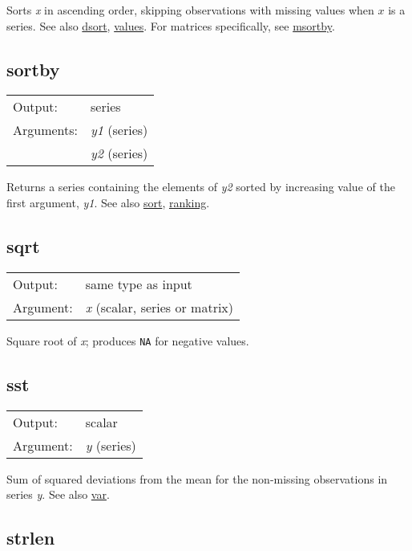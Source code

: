 	  Sorts \textsl{x} in ascending order, skipping
	  observations with missing values when \ensuremath{x} is a
	  series.  
	  See also \hyperlink{func-dsort}{dsort}, \hyperlink{func-values}{values}.
	  For matrices specifically, see \hyperlink{func-msortby}{msortby}.

\subsection{sortby}
\hypertarget{func-sortby}{}

\begin{tabular}{ll}
Output:     & series\\
Arguments:  & \textsl{y1} (series)\\
           & \textsl{y2} (series)\\
\end{tabular}

	  Returns a series containing the elements of
	  \textsl{y2} sorted by increasing value of the first
	  argument, \textsl{y1}. 
	  See also \hyperlink{func-sort}{sort}, \hyperlink{func-ranking}{ranking}.

\subsection{sqrt}
\hypertarget{func-sqrt}{}

\begin{tabular}{ll}
Output:     & same type as input\\
Argument:   & \textsl{x} (scalar, series or matrix)\\
\end{tabular}

	  Square root of \textsl{x}; produces \texttt{NA} for
	  negative values.

\subsection{sst}
\hypertarget{func-sst}{}

\begin{tabular}{ll}
Output:     & scalar\\
Argument:   & \textsl{y} (series)\\
\end{tabular}

	  Sum of squared deviations from the mean for the non-missing
	  observations in series \textsl{y}.
	  See also \hyperlink{func-var}{var}.

\subsection{strlen}
\hypertarget{func-strlen}{}

